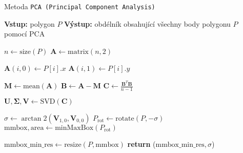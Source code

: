 \begin{algorithm}
    \caption{Metoda \texttt{PCA (Principal Component Analysis)}}
    \begin{algorithmic}[1]
        \STATE \textbf{Vstup:} polygon $P$
        \STATE \textbf{Výstup:} obdélník obsahující všechny body polygonu $P$ pomocí PCA
        
        \STATE $n \gets \text{size}(P)$
        \STATE $\mathbf{A} \gets \text{matrix}(n, 2)$
        
            \STATE $\mathbf{A}(i,0) \gets P[i].x$
            \STATE $\mathbf{A}(i,1) \gets P[i].y$
        \ENDFOR
        
        \STATE $\mathbf{M} \gets \text{mean}(\mathbf{A})$
        \STATE $\mathbf{B} \gets \mathbf{A} - \mathbf{M}$
        \STATE $\mathbf{C} \gets \frac{\mathbf{B}^T \mathbf{B}}{n - 1}$
        
        \STATE $\mathbf{U}, \mathbf{\Sigma}, \mathbf{V} \gets \text{SVD}(\mathbf{C})$
        
        \STATE $\sigma \gets \arctan2(\mathbf{V}_{1,0}, \mathbf{V}_{0,0})$
        \STATE $P_{\text{rot}} \gets \text{rotate}(P, -\sigma)$
        \STATE $\text{mmbox}, \text{area} \gets \text{minMaxBox}(P_{\text{rot}})$
        
        \STATE $\text{mmbox\_min\_res} \gets \text{resize}(P, \text{mmbox})$
        \STATE \textbf{return} ($\text{mmbox\_min\_res}, \sigma$)
    \end{algorithmic}
\end{algorithm}